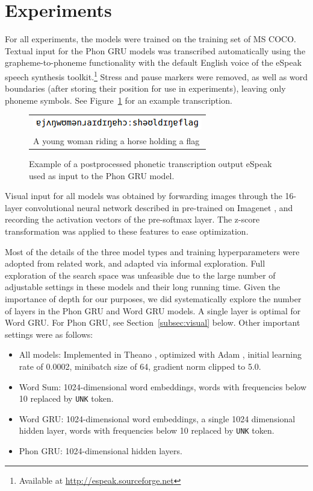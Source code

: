 \section{Experiments}
\label{sec:experiments}

For all experiments, the models were trained on the training set of MS COCO. Textual input for the {\sc Phon GRU} models was transcribed automatically using the grapheme-to-phoneme functionality with the default English voice of the eSpeak speech synthesis toolkit.\footnote{Available at \url{http://espeak.sourceforge.net}} Stress and pause markers were removed, as well as word boundaries (after storing their position for use in experiments), leaving only phoneme symbols. See Figure~\ref{fig:ipa} for an example transcription.

\begin{figure}
  \centering
  \begin{tabular}{|l|}\hline
    \includegraphics[scale=0.7]{woman-ipa.png} \\
    A young woman riding a horse holding a flag\\\hline
  \end{tabular}
  \caption{Example of a postprocessed phonetic transcription output eSpeak used as input to the {\sc Phon GRU} model.}
  \label{fig:ipa}
\end{figure}

Visual input for all models was obtained by forwarding images through the 16-layer convolutional neural network described in  pre-trained on Imagenet \cite{ILSVRCarxiv14}, and recording the activation vectors of the pre-softmax layer. The z-score transformation was applied to these features to ease optimization. 

Most of the details of the three model types and training hyperparameters were adopted from related work, and adapted via informal exploration. Full exploration of the search space was unfeasible due to the large number of adjustable settings in these models and their long running time. Given the importance of depth for our purposes, we did systematically explore the number of layers in the {\sc Phon GRU} and {\sc Word GRU} models. A single layer is optimal for {\sc Word GRU}. For {\sc Phon GRU}, see Section~\ref{subsec:visual} below. Other important settings were as follows:
\begin{itemize}
\item All models: Implemented in Theano \cite{Bastien-Theano-2012}, optimized with 
  Adam \cite{DBLP:journals/corr/KingmaB14}, initial learning rate of 0.0002, minibatch size
  of 64, gradient norm clipped to 5.0.
\item {\sc Word Sum}: 1024-dimensional word embeddings, words with frequencies below 10 replaced by {\tt UNK} token.
\item {\sc Word GRU}: 1024-dimensional word embeddings, a single 1024 dimensional hidden layer, words with frequencies below 10 replaced by {\tt UNK} token.
\item {\sc Phon GRU}: 1024-dimensional hidden layers.
\end{itemize}

